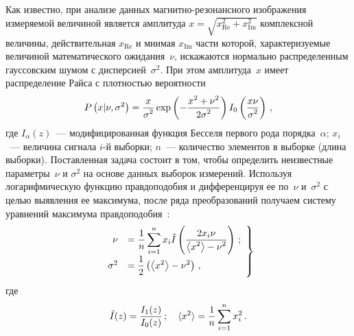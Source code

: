 \begin{multicols}{2}
     Как известно, при анализе данных маг\-нит\-но-ре\-зо\-нанс\-ного изображения измеряемой
величиной является амплитуда $x=\sqrt{x^2_{\mathrm{Re}}+x^2_{\mathrm{Im}}}$
комплексной величины, действительная $x_{\mathrm{Re}}$ и мнимая $x_{\mathrm{Im}}$
час\-ти которой, характеризуемые величиной математического ожидания~$\nu$,
искажаются нормально распределенным гауссовским шумом с дисперсией~$\sigma^2$.
При этом амплитуда~$x$ имеет распределение Райса с плотностью вероятности
     \begin{equation*}
     P\left( x\vert \nu, \sigma^2\right) = \displaystyle\frac{\displaystyle x\mathstrut}{\displaystyle \sigma^2\mathstrut}\exp \left( -
\displaystyle\frac{\displaystyle x^2+\nu^2\mathstrut}{\displaystyle 2\sigma^2\mathstrut}\right) I_0 \left( \displaystyle\frac{\displaystyle x\nu\mathstrut}{\displaystyle \sigma^2\mathstrut}\right)\,,
     \end{equation*}
где $I_\alpha(z)$~--- модифицированная функция Бесселя первого рода порядка~$\alpha$;
$x_i$~--- величина сигнала \mbox{$i$-й} выборки;
$n$~--- количество элементов в выборке (длина
выборки). Поставленная задача состоит в том, чтобы определить неизвестные
параметры~$\nu$ и $\sigma^2$ на основе данных выборок измерений. Используя
логарифмическую функцию правдоподобия и дифференцируя ее по~$\nu$ и~$\sigma^2$ с
целью выявления ее максимума, после ряда преобразований получаем систему уравнений
максимума правдоподобия~\cite{15-ya, 16-ya}:
\begin{equation}
\left.
\begin{array}{rl}
\nu &= \displaystyle\frac{\displaystyle 1\mathstrut}{\displaystyle n\mathstrut} \sum\limits_{i=1}^n x_i \tilde{I} \left( \displaystyle\frac{\displaystyle 2x_i\nu\mathstrut}{\displaystyle 
\left\langle x^2\right\rangle -
\nu^2\mathstrut}\right)\,;\\[9pt]
\sigma^2 &= \displaystyle\frac{\displaystyle 1\mathstrut}{\displaystyle 2\mathstrut}\left( \left\langle x^2\right\rangle -\nu^2\right)\,,
\end{array}
\right\}
\label{e2-ya}
\end{equation}
где
$$
\tilde{I}(z)=\fr{I_1(z)}{I_0(z)}\,; \quad
\langle x^2\rangle \hm = \fr{1}{n} \sum\limits_{i=1}^n x_i^2\,.
$$


\end{multicols}
